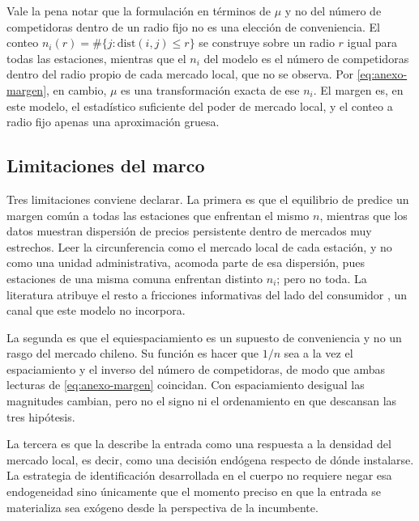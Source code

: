 Vale la pena notar que la formulación en términos de $\mu$ y no del número de
competidoras dentro de un radio fijo no es una elección de conveniencia. El
conteo $n_i(r) = \#\{j : \mathrm{dist}(i,j) \le r\}$ se construye sobre un radio
$r$ igual para todas las estaciones, mientras que el $n_i$ del modelo es el
número de competidoras dentro del radio propio de cada mercado local, que no se
observa. Por \eqref{eq:anexo-margen}, en cambio, $\mu$ es una transformación
exacta de ese $n_i$. El margen es, en este modelo, el estadístico suficiente del
poder de mercado local, y el conteo a radio fijo apenas una aproximación gruesa.

\subsection{Limitaciones del marco}

Tres limitaciones conviene declarar. La primera es que el equilibrio de
\textcite{SALOP1979} predice un margen común a todas las estaciones que enfrentan
el mismo $n$, mientras que los datos muestran dispersión de precios persistente
dentro de mercados muy estrechos. Leer la circunferencia como el mercado local de
cada estación, y no como una unidad administrativa, acomoda parte de esa
dispersión, pues estaciones de una misma comuna enfrentan distinto $n_i$; pero no
toda. La literatura atribuye el resto a fricciones informativas del lado del
consumidor \parencite{FISCHER2025}, un canal que este modelo no incorpora.

La segunda es que el equiespaciamiento es un supuesto de conveniencia y no un
rasgo del mercado chileno. Su función es hacer que $1/n$ sea a la vez el
espaciamiento y el inverso del número de competidoras, de modo que ambas lecturas
de \eqref{eq:anexo-margen} coincidan. Con espaciamiento desigual las magnitudes
cambian, pero no el signo ni el ordenamiento en que descansan las tres hipótesis.

La tercera es que la  describe la entrada como una respuesta a
la densidad del mercado local, es decir, como una decisión endógena respecto de
dónde instalarse. La estrategia de identificación desarrollada en el cuerpo no
requiere negar esa endogeneidad sino únicamente que el momento preciso en que la
entrada se materializa sea exógeno desde la perspectiva de la incumbente.
